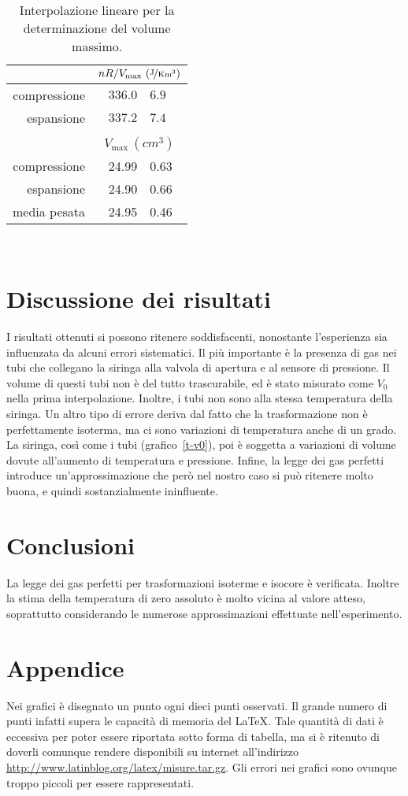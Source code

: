 \documentclass[italian,a4paper]{article}
\begin{document}
\begin{table}[ht]\caption{Interpolazione lineare per la determinazione del volume massimo.}\label{vmax}
\centering
 \begin{tabular}{r r@{$\pm$}l}
&\multicolumn{2}{c}{$nR/V_{\text{max}}\ (\unitfrac{J}{K m^3})$}\\\hline
compressione & $336.0$ & $6.9$\\
espansione  & $337.2$ & $7.4$\\
\\
&\multicolumn{2}{c}{$V_{\text{max}}\ (\unit{cm^3})$}\\\hline
compressione& 24.99&0.63\\
espansione&   24.90&0.66\\
media pesata& 24.95&0.46
 \end{tabular}
\end{table}\\
\section{Discussione dei risultati}
I risultati ottenuti si possono ritenere soddisfacenti, nonostante l'esperienza sia influenzata da alcuni errori sistematici. Il più importante è la presenza di gas nei tubi che collegano la siringa alla valvola di apertura e al sensore di pressione. Il volume di questi tubi non è del tutto trascurabile, ed è stato misurato come $V_0$ nella prima interpolazione. Inoltre, i tubi non sono alla stessa temperatura della siringa. Un altro tipo di errore deriva dal fatto che la trasformazione non è perfettamente isoterma, ma ci sono variazioni di temperatura anche di un grado. La siringa, così come i tubi (grafico~\ref{t-v0}), poi è soggetta a variazioni di volume dovute all'aumento di temperatura e pressione. Infine, la legge dei gas perfetti introduce un'approssimazione che però nel nostro caso si può ritenere molto buona, e quindi sostanzialmente ininfluente.
\section{Conclusioni}
La legge dei gas perfetti per trasformazioni isoterme e isocore è verificata. Inoltre la stima della temperatura di zero assoluto è molto vicina al valore atteso, soprattutto considerando le numerose approssimazioni effettuate nell'esperimento.
\newpage
\section{Appendice}
Nei grafici è disegnato un punto ogni dieci punti osservati. Il grande numero di punti infatti supera le capacità di memoria del \LaTeX. Tale quantità di dati è eccessiva per poter essere riportata sotto forma di tabella, ma si è ritenuto di doverli comunque rendere disponibili su internet all'indirizzo \url{http://www.latinblog.org/latex/misure.tar.gz}.
Gli errori nei grafici sono ovunque troppo piccoli per essere rappresentati.
\end{document}
